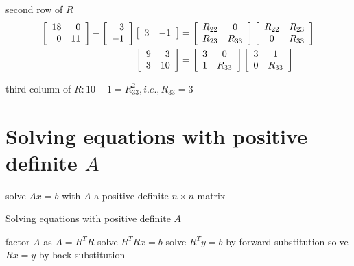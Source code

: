 \begin{example}
second row of $ R $
$$\displaystyle \begin{aligned}
    \left[\begin{array}{ r r }
    18 & 0\\
    0 & 11
    \end{array}\right] -\left[\begin{array}{ r }
    3\\
    -1
    \end{array}\right]\left[\begin{array}{ l l }
    3 & -1
    \end{array}\right] & =\left[\begin{array}{ c c }
    R_{22} & 0\\
    R_{23} & R_{33}
    \end{array}\right]\left[\begin{array}{ c c }
    R_{22} & R_{23}\\
    0 & R_{33}
    \end{array}\right]\\
    \left[\begin{array}{ r r }
    9 & 3\\
    3 & 10
    \end{array}\right] & =\left[\begin{array}{ c c }
    3 & 0\\
    1 & R_{33}
    \end{array}\right]\left[\begin{array}{ c c }
    3 & 1\\
    0 & R_{33}
    \end{array}\right]
    \end{aligned}$$

third column of $ R: 10-1=R_{33}^{2}, i . e ., R_{33}=3 $
\end{example}

\section{Solving equations with positive definite $A$}

\begin{problem}
    solve $ A x=b $ with $ A $ a positive definite $ n \times n $ matrix
\end{problem}

\begin{algorithm}[htbp]
    \caption{Solving equations with positive definite $A$}
    factor $ A $ as $ A=R^{T} R $\;
    solve $ R^{T} R x=b $\;
    solve $ R^{T} y=b $ by forward substitution\;
    solve $ R x=y $ by back substitution\;
\end{algorithm}


